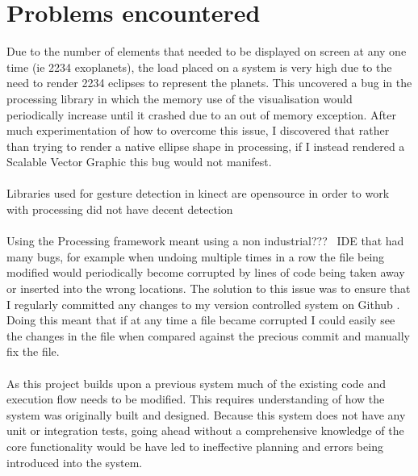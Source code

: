 \section{Problems encountered}
Due to the number of elements that needed to be displayed on screen at any one
time (ie 2234 exoplanets), the load placed on a system is very high due to the
need to render 2234 eclipses to represent the planets. This uncovered a bug in
the processing library in which the memory use of the visualisation would
periodically increase until it crashed due to an out of memory exception. After
much experimentation of how to overcome this issue, I discovered that rather
than trying to render a native ellipse shape in processing, if I instead
rendered
a Scalable Vector Graphic this bug would not manifest. 
\\\\
Libraries used for gesture detection in kinect are opensource in order to work
with processing did not have decent detection
\\\\
Using the Processing framework meant using a non industrial???~ IDE that had
many bugs, for example when undoing multiple times in a row the file being
modified would periodically become corrupted by lines of code being taken away
or inserted into the wrong locations. The solution to this issue was to ensure
that I regularly committed any changes to my version controlled system on Github
\cite{github}. Doing this meant that if at any time a file became corrupted I
could easily see the changes in the file when compared against the precious
commit and manually fix the file. 
\\\\
As this project builds upon a previous system much of the existing code and
execution flow needs to be modified. This requires understanding of how the
system was originally built and designed. Because this system does not have any
unit or integration tests, going ahead without a comprehensive knowledge of the
core functionality would be have led to ineffective planning and errors being
introduced into the system.
